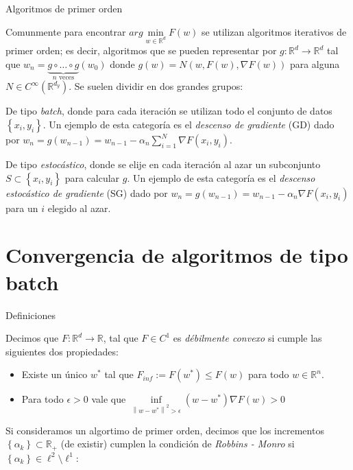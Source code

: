 \documentclass{beamer}
\newcommand{\R}{{\mathbb{R}}}
\newcommand{\norm}[1]{\left\lVert#1\right\rVert}
\newcommand{\sett}[1]{\left\lbrace#1\right\rbrace}
\begin{document}
\begin{frame}{Algoritmos de primer orden}

Comunmente para encontrar $arg\min\limits_{w \in \R^d}{F(w)}$ se utilizan algoritmos iterativos de primer orden; es decir, algoritmos que se pueden representar por $g : \R^d \rightarrow \R^d$ tal que $w_n = \underbrace{g \circ \dots \circ g}_{n \text{ veces}} (w_0)$ donde $g(w) = N\left(w, F(w), \nabla F(w)\right)$ para alguna $N \in C^{\infty}(\R^{d_y})$. Se suelen dividir en dos grandes grupos:

\pause

\bigskip

De tipo \textit{batch}, donde para cada iteraci\'on se utilizan todo el conjunto de datos $\sett{x_i, y_i}$. Un ejemplo de esta categor\'ia es el \textit{descenso de gradiente} (GD) dado por $w_n = g(w_{n-1}) = w_{n-1} - \alpha_n\sum\limits_{i=1}^{N} \nabla F(x_i, y_i)$.

\pause
\bigskip

De tipo \textit{estoc\'astico}, donde se elije en cada iteraci\'on al azar un subconjunto $S \subset \sett{x_i, y_i}$ para calcular $g$. Un ejemplo de esta categor\'ia es el \textit{descenso estoc\'astico de gradiente} (SG) dado por $w_n = g(w_{n-1}) = w_{n-1} - \alpha_n\nabla F(x_i, y_i)$ para un $i$ elegido al azar.

\end{frame}

\section{Convergencia de algoritmos de tipo batch}

\begin{frame}{Definiciones}


\begin{definition}
	Decimos que $F: \R^d \rightarrow \R$, tal que $F \in C^1$ es \textit{d\'ebilmente convexo} si cumple las siguientes dos propiedades:
	
	\begin{itemize}
		\item Existe un \'unico $w^*$ tal que $F_{inf} := F(w^*) \leq F(w)$ para todo $w \in \R^n$.
		\item Para todo $\epsilon > 0$ vale que $\inf\limits_{\norm{w-w^*}^2 > \epsilon} {\left(w - w^*\right) \nabla F(w) > 0}$
	\end{itemize}
	
\end{definition}

\smallskip

\begin{definition}
	Si consideramos un algortimo de primer orden, decimos que los incrementos $\sett{\alpha_k} \subset \R_+$ (de existir) cumplen la condici\'on de \textit{Robbins - Monro} \nocite{robbins:1951} si $\sett{\alpha_k} \in \ell^2 \setminus \ell^1$:
\end{definition}

\end{frame}
\end{document}
